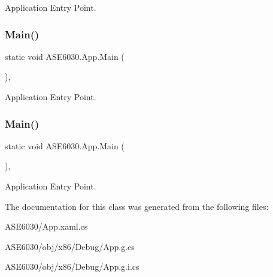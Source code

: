 Application Entry Point. 

\mbox{\label{class_a_s_e6030_1_1_app_abf70d608fded53409f9aff64e8a723b3}} 
\subsubsection{\texorpdfstring{Main()}{Main()}\hspace{0.1cm}{\footnotesize\ttfamily [2/3]}}
{\footnotesize\ttfamily static void A\+S\+E6030.\+App.\+Main (\begin{DoxyParamCaption}{ }\end{DoxyParamCaption})\hspace{0.3cm}{\ttfamily [inline]}, {\ttfamily [static]}}



Application Entry Point. 

\mbox{\label{class_a_s_e6030_1_1_app_abf70d608fded53409f9aff64e8a723b3}} 
\subsubsection{\texorpdfstring{Main()}{Main()}\hspace{0.1cm}{\footnotesize\ttfamily [3/3]}}
{\footnotesize\ttfamily static void A\+S\+E6030.\+App.\+Main (\begin{DoxyParamCaption}{ }\end{DoxyParamCaption})\hspace{0.3cm}{\ttfamily [inline]}, {\ttfamily [static]}}



Application Entry Point. 



The documentation for this class was generated from the following files\+:\begin{DoxyCompactItemize}
\item 
A\+S\+E6030/App.\+xaml.\+cs\item 
A\+S\+E6030/obj/x86/\+Debug/App.\+g.\+cs\item 
A\+S\+E6030/obj/x86/\+Debug/App.\+g.\+i.\+cs\end{DoxyCompactItemize}
